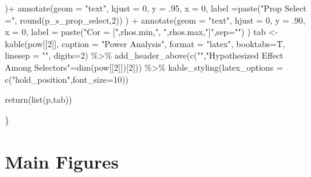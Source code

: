 \documentclass[
]{article}
\newenvironment{Shaded}{\begin{snugshade}}{\end{snugshade}}
\newcommand{\AttributeTok}[1]{\textcolor[rgb]{0.77,0.63,0.00}{#1}}
\newcommand{\DecValTok}[1]{\textcolor[rgb]{0.00,0.00,0.81}{#1}}
\newcommand{\FunctionTok}[1]{\textcolor[rgb]{0.00,0.00,0.00}{#1}}
\newcommand{\NormalTok}[1]{#1}
\newcommand{\OtherTok}[1]{\textcolor[rgb]{0.56,0.35,0.01}{#1}}
\newcommand{\SpecialCharTok}[1]{\textcolor[rgb]{0.00,0.00,0.00}{#1}}
\newcommand{\StringTok}[1]{\textcolor[rgb]{0.31,0.60,0.02}{#1}}
\begin{document}
\begin{Shaded}
\begin{Highlighting}[]
\NormalTok{    )}\SpecialCharTok{+}
    \FunctionTok{annotate}\NormalTok{(}\AttributeTok{geom =} \StringTok{"text"}\NormalTok{,}
             \AttributeTok{hjust =} \DecValTok{0}\NormalTok{,}
             \AttributeTok{y =}\NormalTok{ .}\DecValTok{95}\NormalTok{,}
             \AttributeTok{x =} \DecValTok{0}\NormalTok{,}
             \AttributeTok{label =}\FunctionTok{paste}\NormalTok{(}\StringTok{"Prop Select ="}\NormalTok{, }\FunctionTok{round}\NormalTok{(p\_s\_prop\_select,}\DecValTok{2}\NormalTok{))}
\NormalTok{    ) }\SpecialCharTok{+}
    \FunctionTok{annotate}\NormalTok{(}\AttributeTok{geom =} \StringTok{"text"}\NormalTok{,}
             \AttributeTok{hjust =} \DecValTok{0}\NormalTok{,}
             \AttributeTok{y =}\NormalTok{ .}\DecValTok{90}\NormalTok{,}
             \AttributeTok{x =} \DecValTok{0}\NormalTok{,}
             \AttributeTok{label =} \FunctionTok{paste}\NormalTok{(}\StringTok{"Cor = ["}\NormalTok{,rhos.min,}\StringTok{", "}\NormalTok{,rhos.max,}\StringTok{"]"}\NormalTok{,}\AttributeTok{sep=}\StringTok{""}\NormalTok{)}
\NormalTok{    )}
\NormalTok{  tab }\OtherTok{\textless{}{-}} \FunctionTok{kable}\NormalTok{(pow[[}\DecValTok{2}\NormalTok{]],}
               \AttributeTok{caption =} \StringTok{"Power Analysis"}\NormalTok{,}
               \AttributeTok{format =} \StringTok{"latex"}\NormalTok{,}
               \AttributeTok{booktabs=}\NormalTok{T, }
               \AttributeTok{linesep =} \StringTok{""}\NormalTok{,}
               \AttributeTok{digits=}\DecValTok{2}\NormalTok{) }\SpecialCharTok{\%\textgreater{}\%}
    \FunctionTok{add\_header\_above}\NormalTok{(}\FunctionTok{c}\NormalTok{(}\StringTok{""}\NormalTok{,}\StringTok{"Hypothesized Effect Among Selectors"}\OtherTok{=}\FunctionTok{dim}\NormalTok{(pow[[}\DecValTok{2}\NormalTok{]])[}\DecValTok{2}\NormalTok{])) }\SpecialCharTok{\%\textgreater{}\%}
    \FunctionTok{kable\_styling}\NormalTok{(}\AttributeTok{latex\_options =} \FunctionTok{c}\NormalTok{(}\StringTok{"hold\_position"}\NormalTok{,}\AttributeTok{font\_size=}\DecValTok{10}\NormalTok{))}
  
  \FunctionTok{return}\NormalTok{(}\FunctionTok{list}\NormalTok{(p,tab))}
  
  
\NormalTok{\}}
\end{Highlighting}
\end{Shaded}

\hypertarget{main-figures}{%
\section{Main Figures}\label{main-figures}}
\end{document}
